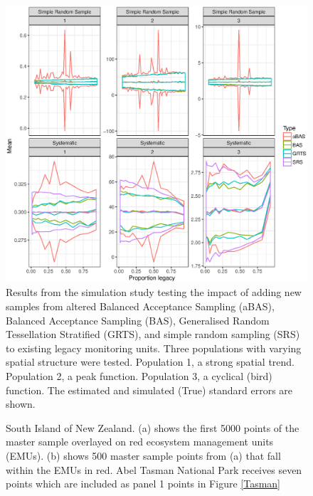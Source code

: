 \documentclass[titlepage]{article}
\begin{document}
\begin{figure}[H]
	\includegraphics[scale = 0.5]{Estimation.eps}
	\caption{Results from the simulation study testing the impact of adding new samples from altered Balanced Acceptance Sampling (aBAS), Balanced Acceptance Sampling (BAS), Generalised Random Tessellation Stratified (GRTS), and simple random sampling (SRS) to existing legacy monitoring units. Three populations with varying spatial structure were tested. Population 1, a strong spatial trend. Population 2, a peak function. Population 3, a cyclical (bird) function. The estimated and simulated (True) standard errors are shown.}
	\label{estimation}
\end{figure}

\newpage


\begin{figure}[H]
	\centering
	\hfill
	\caption{South Island of New Zealand. (a) shows the first 5000 points of the master sample overlayed on red ecosystem management units (EMUs). (b) shows 500 master sample points from (a) that fall within the EMUs in red. Abel Tasman National Park receives seven points which are included as panel 1 points in Figure \ref{Tasman}}
	\label{EMU}
\end{figure}

\newpage
\end{document}
